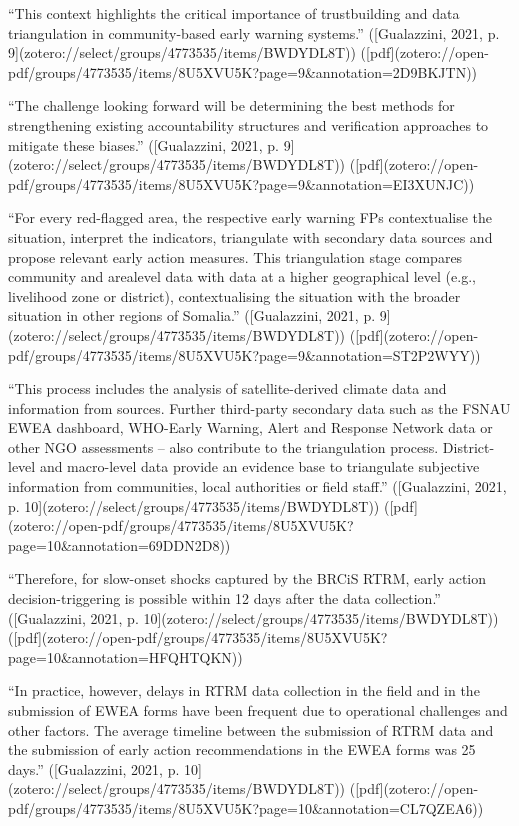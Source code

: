 {“This context highlights the critical importance of trustbuilding and data triangulation in community-based early warning systems.” ([Gualazzini, 2021, p. 9](zotero://select/groups/4773535/items/BWDYDL8T)) ([pdf](zotero://open-pdf/groups/4773535/items/8U5XVU5K?page=9&annotation=2D9BKJTN))

“The challenge looking forward will be determining the best methods for strengthening existing accountability structures and verification approaches to mitigate these biases.” ([Gualazzini, 2021, p. 9](zotero://select/groups/4773535/items/BWDYDL8T)) ([pdf](zotero://open-pdf/groups/4773535/items/8U5XVU5K?page=9&annotation=EI3XUNJC))

“For every red-flagged area, the respective early warning FPs contextualise the situation, interpret the indicators, triangulate with secondary data sources and propose relevant early action measures. This triangulation stage compares community and arealevel data with data at a higher geographical level (e.g., livelihood zone or district), contextualising the situation with the broader situation in other regions of Somalia.” ([Gualazzini, 2021, p. 9](zotero://select/groups/4773535/items/BWDYDL8T)) ([pdf](zotero://open-pdf/groups/4773535/items/8U5XVU5K?page=9&annotation=ST2P2WYY))

“This process includes the analysis of satellite-derived climate data and information from sources. Further third-party secondary data such as the FSNAU EWEA dashboard, WHO-Early Warning, Alert and Response Network data or other NGO assessments – also contribute to the triangulation process. District-level and macro-level data provide an evidence base to triangulate subjective information from communities, local authorities or field staff.” ([Gualazzini, 2021, p. 10](zotero://select/groups/4773535/items/BWDYDL8T)) ([pdf](zotero://open-pdf/groups/4773535/items/8U5XVU5K?page=10&annotation=69DDN2D8))

“Therefore, for slow-onset shocks captured by the BRCiS RTRM, early action decision-triggering is possible within 12 days after the data collection.” ([Gualazzini, 2021, p. 10](zotero://select/groups/4773535/items/BWDYDL8T)) ([pdf](zotero://open-pdf/groups/4773535/items/8U5XVU5K?page=10&annotation=HFQHTQKN))

“In practice, however, delays in RTRM data collection in the field and in the submission of EWEA forms have been frequent due to operational challenges and other factors. The average timeline between the submission of RTRM data and the submission of early action recommendations in the EWEA forms was 25 days.” ([Gualazzini, 2021, p. 10](zotero://select/groups/4773535/items/BWDYDL8T)) ([pdf](zotero://open-pdf/groups/4773535/items/8U5XVU5K?page=10&annotation=CL7QZEA6))

}
